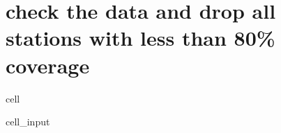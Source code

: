 \documentclass[letterpaper,10pt,english]{jupyterBook}
\begin{document}
\section{check the data and drop all stations with less than 80\% coverage}
\label{\detokenize{notebooks/regional_and_local/SL_anomaly_intra-annual:check-the-data-and-drop-all-stations-with-less-than-80-coverage}}
\begin{sphinxuseclass}{cell}\begin{sphinxVerbatimInput}

\begin{sphinxuseclass}{cell_input}
\begin{sphinxVerbatim}[commandchars=\\\{\}]
  

  

\end{sphinxVerbatim}

\end{sphinxuseclass}\end{sphinxVerbatimInput}
\begin{sphinxVerbatimOutput}


\end{sphinxVerbatimOutput}
\end{sphinxuseclass}
\end{document}
